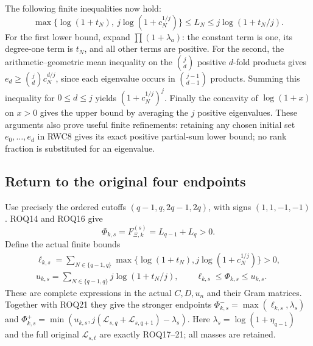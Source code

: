 \documentclass[11pt,a4paper]{article}
\begin{document}
The following finite inequalities now hold:
\begin{equation}\tag{RWC9}
\max\{\log(1+t_N),\ j\log(1+c_N^{1/j})\}
\le L_N\le j\log(1+t_N/j).
\end{equation}
For the first lower bound, expand $\prod(1+\lambda_a)$: the
constant term is one, its degree-one term is $t_N$, and all other
terms are positive. For the second, the arithmetic--geometric
mean inequality on the $\binom jd$ positive $d$-fold products
gives
$e_d\ge\binom jd c_N^{d/j}$, since each eigenvalue occurs in
$\binom{j-1}{d-1}$ products. Summing this inequality for
$0\le d\le j$ yields $(1+c_N^{1/j})^j$.
Finally the concavity of $\log(1+x)$ on $x>0$ gives the upper
bound by averaging the $j$ positive eigenvalues. These arguments
also prove useful finite refinements: retaining any chosen initial
set $e_0,\ldots,e_d$ in RWC8 gives its exact positive partial-sum
lower bound; no rank fraction is substituted for an eigenvalue.

\subsection{Return to the original four endpoints}
Use precisely the ordered cutoffs $(q-1,q,2q-1,2q)$, with signs
$(1,1,-1,-1)$. ROQ14 and ROQ16 give
\begin{equation}\tag{RWC10}
\Phi_{k,s}=F_{\Xi,k}^{(s)}=L_{q-1}+L_q>0.
\end{equation}
Define the actual finite bounds
\begin{equation}\tag{RWC11}
\begin{gathered}
\ell_{k,s}=\sum_{N\in\{q-1,q\}}
\max\{\log(1+t_N),j\log(1+c_N^{1/j})\}>0,\\
u_{k,s}=\sum_{N\in\{q-1,q\}}j\log(1+t_N/j),
\qquad \ell_{k,s}\le\Phi_{k,s}\le u_{k,s}.
\end{gathered}
\end{equation}
These are complete expressions in the actual $C,D,u_n$ and their
Gram matrices. Together with ROQ21 they give the stronger endpoints
$\Phi^-_{k,s}=\max(\ell_{k,s},\lambda_s)$ and
$\Phi^+_{k,s}=\min(u_{k,s},
j(\mathcal L_{s,q}+\mathcal L_{s,q+1})-\lambda_s)$.
Here $\lambda_s=\log(1+\eta_{q-1})$ and the full original
$\mathcal L_{s,t}$ are exactly ROQ17--21; all masses are retained.
\end{document}
